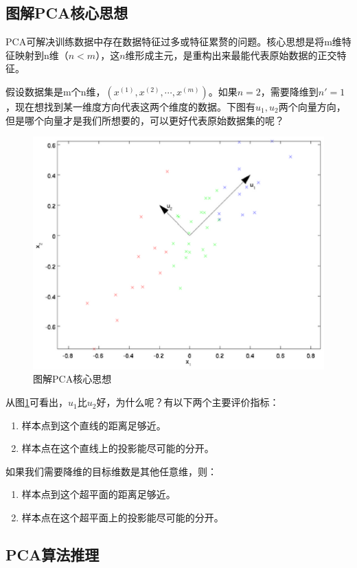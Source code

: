 \subsection{图解PCA核心思想}
PCA可解决训练数据中存在数据特征过多或特征累赘的问题。核心思想是将m维特征映射到n维（$n<m$），这$n$维形成主元，是重构出来最能代表原始数据的正交特征。

假设数据集是m个n维，$( x^{(1)},  x^{(2)}, \cdots,  x^{(m)})$。如果$n=2$，需要降维到$n'=1$，现在想找到某一维度方向代表这两个维度的数据。下图有$u_1, u_2$两个向量方向，但是哪个向量才是我们所想要的，可以更好代表原始数据集的呢？

 \begin{figure}[h]
   \centering
   \includegraphics[width=.7\textwidth]{imgs/2.34.1.eps}
   \caption{图解PCA核心思想}
   \label{fig:2.34.1}
 \end{figure}

从图\ref{fig:2.34.1}可看出，$u_1$比$u_2$好，为什么呢？有以下两个主要评价指标：

\begin{enumerate}
\itemsep0em
\item 样本点到这个直线的距离足够近。
\item 样本点在这个直线上的投影能尽可能的分开。
\end{enumerate}

如果我们需要降维的目标维数是其他任意维，则：

\begin{enumerate}
\itemsep0em
\item 样本点到这个超平面的距离足够近。
\item 样本点在这个超平面上的投影能尽可能的分开。
\end{enumerate}

\subsection{PCA算法推理}

